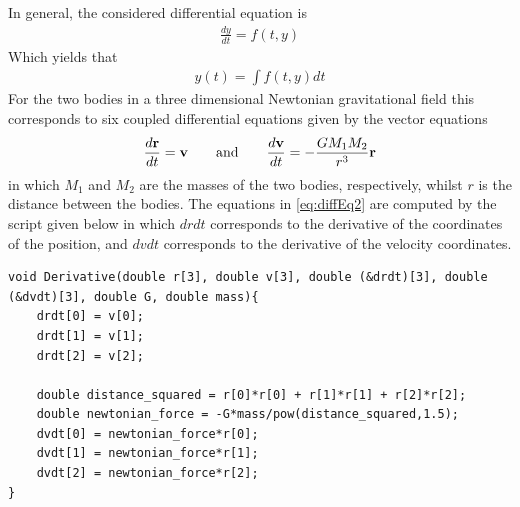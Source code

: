 In general, the considered differential equation is
\begin{align}
	\frac{dy}{dt} = f(t,y)
	\label{eq:diffEq1}
\end{align}
Which yields that
\begin{align}
	y(t) = \int f(t,y) dt
\end{align}
For the two bodies in a three dimensional Newtonian gravitational field this corresponds to six coupled differential equations given by the vector equations
\begin{align}
	\frac{d\mbox{\textbf{r}}}{dt} = \mbox{\textbf{v}}
	\qquad \text{and} \qquad
	\frac{d\mbox{\textbf{v}}}{dt} = - \frac{G M_1 M_2}{r^3} \mbox{\textbf{r}}
	\label{eq:diffEq2}
\end{align}
in which $M_1$ and $M_2$  are the masses of the two bodies, respectively, whilst $r$ is the distance between the bodies.
The equations in \eqref{eq:diffEq2} are computed by the script given below in which $drdt$ corresponds to the derivative of the coordinates of the position, and $dvdt$ corresponds to the derivative of the velocity coordinates. 
\begin{lstlisting}
void Derivative(double r[3], double v[3], double (&drdt)[3], double (&dvdt)[3], double G, double mass){
    drdt[0] = v[0];
    drdt[1] = v[1];
    drdt[2] = v[2];

    double distance_squared = r[0]*r[0] + r[1]*r[1] + r[2]*r[2];
    double newtonian_force = -G*mass/pow(distance_squared,1.5);
    dvdt[0] = newtonian_force*r[0];
    dvdt[1] = newtonian_force*r[1];
    dvdt[2] = newtonian_force*r[2];
}
\end{lstlisting}
